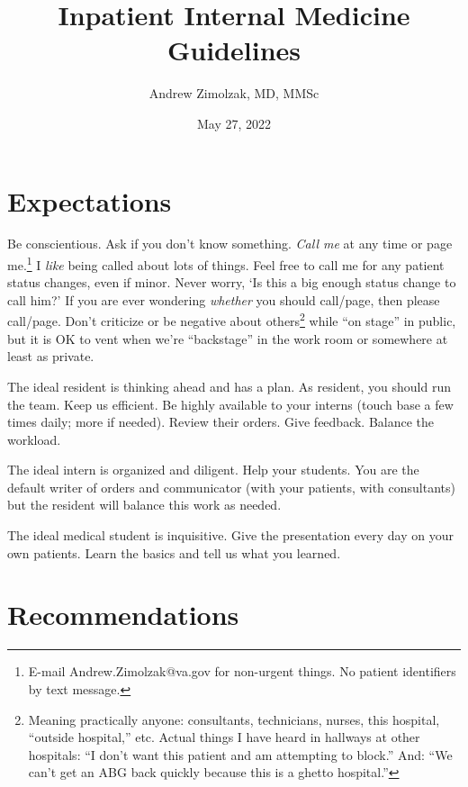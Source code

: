\documentclass{tufte-handout}
\title{Inpatient Internal Medicine Guidelines}
\author{Andrew Zimolzak, MD, MMSc}
\date{May 27, 2022}
\begin{document}
\maketitle

\section{Expectations}

Be conscientious. Ask if you don't know something. \emph{Call me} at
any time or page me.\footnote{E-mail
Andrew.Zimolzak@va.gov for non-urgent things. No patient identifiers
by text message.} I \emph{like} being called about lots of things.
Feel free to call me for any patient status changes, even if minor.
Never worry, `Is this a big enough status change to call him?' If you
are ever wondering \emph{whether} you should call/page, then please
call/page. Don't criticize or be negative about
others\footnote{Meaning practically anyone: consultants, technicians,
nurses, this hospital, ``outside hospital,'' etc. Actual things I have
heard in hallways at other hospitals: ``I don't want this patient and
am attempting to block.'' And: ``We can't get an ABG back quickly
because this is a ghetto hospital.''} while ``on stage'' in public,
but it is OK to vent when we're ``backstage'' in the work room or
somewhere at least as private.

The ideal resident is thinking ahead and has a plan. As resident, you
should run the team. Keep us efficient. Be highly available to your
interns (touch base a few times daily; more if needed). Review their
orders. Give feedback. Balance the workload.

The ideal intern is organized and diligent. Help your students. You
are the default writer of orders and communicator (with your patients,
with consultants) but the resident will balance this work as needed.

The ideal medical student is inquisitive. Give the presentation every
day on your own patients. Learn the basics and tell us what you
learned.




\section{Recommendations}

\end{document}
